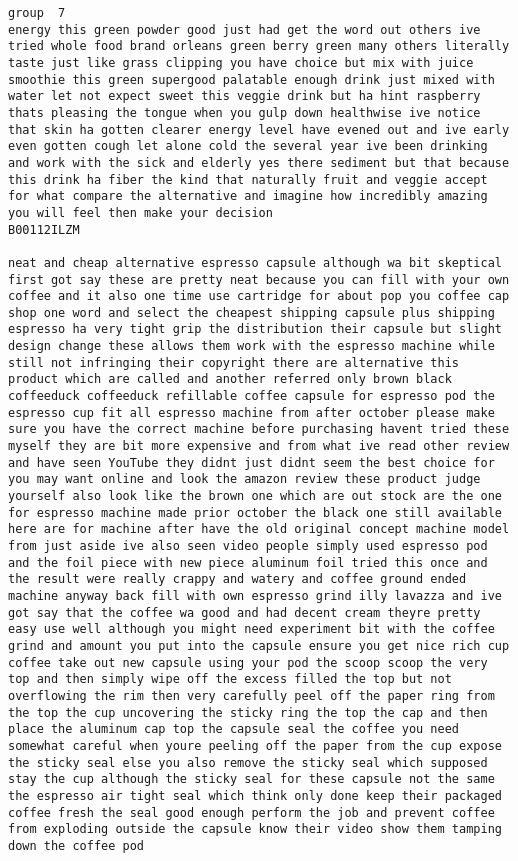 \documentclass[11pt]{article}
\begin{document}
\begin{Verbatim}[commandchars=\\\{\}]
group  7
energy this green powder good just had get the word out others ive tried whole food brand orleans green berry green many others literally taste just like grass clipping you have choice but mix with juice smoothie this green supergood palatable enough drink just mixed with water let not expect sweet this veggie drink but ha hint raspberry thats pleasing the tongue when you gulp down healthwise ive notice that skin ha gotten clearer energy level have evened out and ive early even gotten cough let alone cold the several year ive been drinking and work with the sick and elderly yes there sediment but that because this drink ha fiber the kind that naturally fruit and veggie accept for what compare the alternative and imagine how incredibly amazing you will feel then make your decision
B00112ILZM

neat and cheap alternative espresso capsule although wa bit skeptical first got say these are pretty neat because you can fill with your own coffee and it also one time use cartridge for about pop you coffee cap shop one word and select the cheapest shipping capsule plus shipping espresso ha very tight grip the distribution their capsule but slight design change these allows them work with the espresso machine while still not infringing their copyright there are alternative this product which are called and another referred only brown black coffeeduck coffeeduck refillable coffee capsule for espresso pod the espresso cup fit all espresso machine from after october please make sure you have the correct machine before purchasing havent tried these myself they are bit more expensive and from what ive read other review and have seen YouTube they didnt just didnt seem the best choice for you may want online and look the amazon review these product judge yourself also look like the brown one which are out stock are the one for espresso machine made prior october the black one still available here are for machine after have the old original concept machine model from just aside ive also seen video people simply used espresso pod and the foil piece with new piece aluminum foil tried this once and the result were really crappy and watery and coffee ground ended machine anyway back fill with own espresso grind illy lavazza and ive got say that the coffee wa good and had decent cream theyre pretty easy use well although you might need experiment bit with the coffee grind and amount you put into the capsule ensure you get nice rich cup coffee take out new capsule using your pod the scoop scoop the very top and then simply wipe off the excess filled the top but not overflowing the rim then very carefully peel off the paper ring from the top the cup uncovering the sticky ring the top the cap and then place the aluminum cap top the capsule seal the coffee you need somewhat careful when youre peeling off the paper from the cup expose the sticky seal else you also remove the sticky seal which supposed stay the cup although the sticky seal for these capsule not the same the espresso air tight seal which think only done keep their packaged coffee fresh the seal good enough perform the job and prevent coffee from exploding outside the capsule know their video show them tamping down the coffee pod 
\end{Verbatim}
\end{document}
